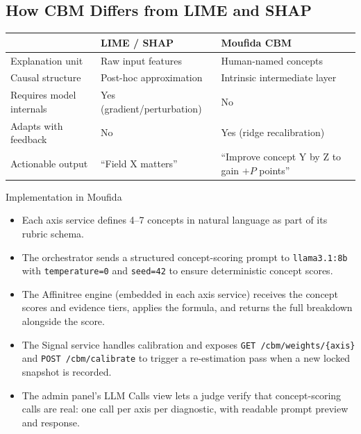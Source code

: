 \documentclass[11pt,a4paper]{article}
\begin{document}
\subsection{How CBM Differs from LIME and SHAP}

\begin{center}\small
\begin{tabular}{@{}lll@{}}
\toprule
& \textbf{LIME / SHAP} & \textbf{Moufida CBM} \\
\midrule
Explanation unit        & Raw input features         & Human-named concepts \\
Causal structure        & Post-hoc approximation     & Intrinsic intermediate layer \\
Requires model internals & Yes (gradient/perturbation) & No \\
Adapts with feedback    & No                          & Yes (ridge recalibration) \\
Actionable output       & ``Field X matters''         & ``Improve concept Y by Z to gain $+P$ points'' \\
\bottomrule
\end{tabular}
\end{center}

\begin{implbox}{Implementation in Moufida}
\begin{itemize}[leftmargin=1em]
  \item Each axis service defines 4–7 concepts in natural language as part of its rubric schema.
  \item The orchestrator sends a structured concept-scoring prompt to \texttt{llama3.1:8b}
        with \texttt{temperature=0} and \texttt{seed=42} to ensure deterministic concept scores.
  \item The Affinitree engine (embedded in each axis service) receives the concept scores
        and evidence tiers, applies the formula, and returns the full breakdown alongside the score.
  \item The Signal service handles calibration and exposes \texttt{GET /cbm/weights/\{axis\}}
        and \texttt{POST /cbm/calibrate} to trigger a re-estimation pass when a new locked
        snapshot is recorded.
  \item The admin panel's LLM Calls view lets a judge verify that concept-scoring calls
        are real: one call per axis per diagnostic, with readable prompt preview and response.
\end{itemize}
\end{implbox}
\end{document}
